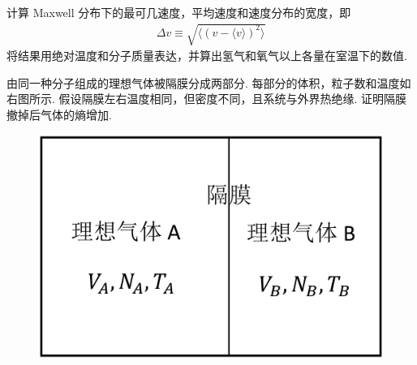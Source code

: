 \documentclass{assignment}
\begin{document}
\begin{prob}
    计算 Maxwell 分布下的最可几速度，平均速度和速度分布的宽度，即
    \begin{align}
        \Delta v\equiv\sqrt{\langle(v-\langle v\rangle)^2\rangle}
    \end{align}
    将结果用绝对温度和分子质量表达，并算出氢气和氧气以上各量在室温下的数值.
\end{prob}
\begin{sol}
    
\end{sol}

\begin{prob}
    由同一种分子组成的理想气体被隔膜分成两部分. 每部分的体积，粒子数和温度如右图所示. 假设隔膜左右温度相同，但密度不同，且系统与外界热绝缘. 证明隔膜撤掉后气体的熵增加.
    \begin{figure}[htb]
        \centering
        \includegraphics[width=.4\columnwidth]{A6-P2.png}
    \end{figure}
\end{prob}
\end{document}
